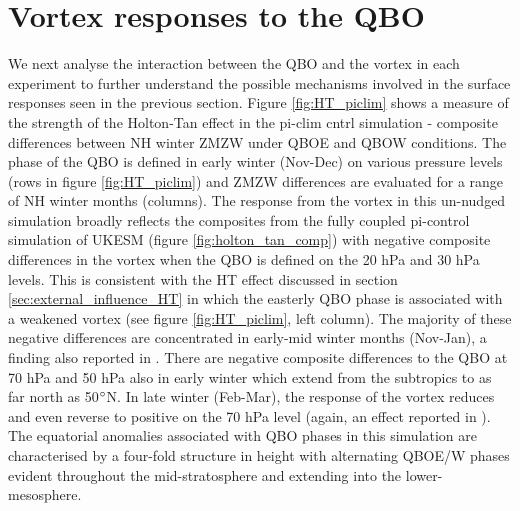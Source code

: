 \section{Vortex responses to the QBO}
\label{sec:vortex_responses_QBO}
We next analyse the interaction between the QBO and the vortex in each experiment to further understand the possible mechanisms involved in the surface responses seen in the previous section. Figure \ref{fig:HT_piclim} shows a measure of the strength of the Holton-Tan effect in the pi-clim cntrl simulation - composite differences between NH winter ZMZW under QBOE and QBOW conditions. The phase of the QBO is defined in early winter (Nov-Dec) on various pressure levels (rows in figure \ref{fig:HT_piclim}) and ZMZW differences are evaluated for a range of NH winter months (columns). The response from the vortex in this un-nudged simulation broadly reflects the composites from the fully coupled pi-control simulation of UKESM (figure \ref{fig:holton_tan_comp}) with negative composite differences in the vortex when the QBO is defined on the 20 hPa and 30 hPa levels. This is consistent with the HT effect discussed in section \ref{sec:external_influence_HT} in which the easterly QBO phase is associated with a weakened vortex (see figure \ref{fig:HT_piclim}, left column). The majority of these negative differences are concentrated in early-mid winter months (Nov-Jan), a finding also reported in \cite{graySurface2018b}. There are negative composite differences to the QBO at 70 hPa and 50 hPa also in early winter which extend from the subtropics to as far north as 50$\degree$N. In late winter (Feb-Mar), the response of the vortex reduces and even reverse to positive on the 70 hPa level (again, an effect reported in \cite{graySurface2018b}). The equatorial anomalies associated with QBO phases in this simulation are characterised by a four-fold structure in height with alternating QBOE/W phases evident throughout the mid-stratosphere and extending into the lower-mesosphere.

